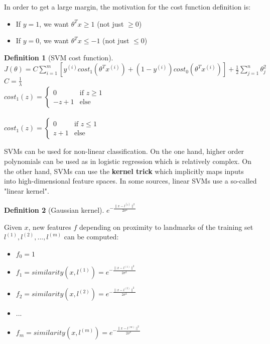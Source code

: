 \documentclass{report}
\newtheorem{definition}{Definition}[section]
\begin{document}
In order to get a large margin, the motivation for the cost function definition is:
\begin{itemize}
\item If $y=1$, we want $\theta^Tx\ge 1$ (not just $\ge 0$)
\item If $y=0$, we want $\theta^Tx\le -1$ (not just $\le 0$)
\end{itemize}

\begin{definition}[SVM cost function]~\\
$J(\theta)=C\sum_{i=1}^m[y^{(i)}cost_1(\theta^Tx^{(i)})+(1-y^{(i)})cost_0(\theta^Tx^{(i)})]+\frac{1}{2}\sum_{j=1}^n\theta_j^2$
\\
$C = \frac{1}{\lambda}$
\\
$cost_1(z)=
\left\{
\begin{array}{lll}
0  & \mbox{if } z \ge 1 \\
-z + 1  & \mbox{else}
\end{array}
\right.$ \\
\\
$cost_1(z)=
\left\{
\begin{array}{lll}
0  & \mbox{if } z \le 1 \\
z + 1  & \mbox{else}
\end{array}
\right.$ \\
\end{definition}

SVMs can be used for non-linear classification. On the one hand, higher order polynomials can be used as in logistic regression which is relatively complex. On the other hand, SVMs can use the {\bf kernel trick} which implicitly maps inputs into high-dimensional feature spaces. In some sources, linear SVMs use a so-called "linear kernel".

\begin{definition}[Gaussian kernel]
$e^{-\frac{\lVert x - l^{(i)} \rVert^2}{2\sigma^2}}$
\end{definition}

Given $x$, new features $f$ depending on proximity to landmarks of the training set $l^{(1)}, l^{(2)}, ..., l^{(m)}$ can be computed:
\begin{itemize}
\item $f_0 = 1$
\item $f_1 = similarity(x,l^{(1)})=e^{-\frac{\lVert x - l^{(1)} \rVert^2}{2\sigma^2}}$
\item $f_2 = similarity(x,l^{(2)})=e^{-\frac{\lVert x - l^{(2)} \rVert^2}{2\sigma^2}}$
\item ...
\item $f_m = similarity(x,l^{(m)})=e^{-\frac{\lVert x - l^{(m)} \rVert^2}{2\sigma^2}}$
\end{itemize}
\end{document}
